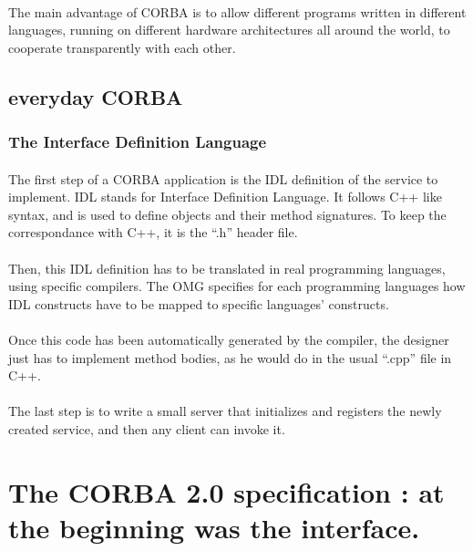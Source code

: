 \paragraph{}The main advantage of CORBA is to allow different programs
written in different languages, running on different hardware
architectures all around the world, to cooperate transparently with each other.

\subsection{everyday CORBA}

\subsubsection{The Interface Definition Language}
\paragraph{} The first step of a CORBA application is the IDL
definition of the service to implement. IDL stands for Interface
Definition Language. It follows C++ like syntax, and is used to define
objects and their method signatures. To keep the correspondance with
C++, it is the ``.h'' header file.

\paragraph{} Then, this IDL definition has to be translated in real
programming languages, using specific compilers. The OMG specifies for
each programming languages how IDL constructs have to be mapped to
specific languages' constructs.

\paragraph{} Once this code has been automatically generated by the
compiler, the designer just has to implement method bodies, as he
would do in the usual ``.cpp'' file in C++.

\paragraph{} The last step is to write a small server that initializes
and registers the newly created service, and then any client can
invoke it.



\section{The CORBA 2.0 specification : at the beginning was the
interface.}

